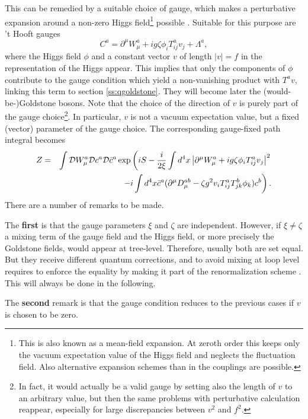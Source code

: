 \documentclass[final,twoside,12pt]{article}
\newcommand*{\no}{\noindent}
\newcommand*{\bea}{\begin{eqnarray}}
\newcommand*{\eea}{\end{eqnarray}}
\newcommand*{\be}{\begin{equation}}
\newcommand*{\ee}{\end{equation}}
\newcommand*{\pd}{\partial}
\newcommand*{\nn}{\nonumber}
\newcommand*{\1}{1\!\!\!\bot}
\begin{document}
This can be remedied by a suitable choice of gauge, which makes a perturbative expansion around a non-zero Higgs field\footnote{This is also known as a mean-field expansion. At zeroth order this keeps only the vacuum expectation value of the Higgs field and neglects the fluctuation field. Also alternative expansion schemes than in the couplings are possible.} possible \cite{Lee:1972fj,Lee:1974zg,Lee:1972yfa,Bohm:2001yx}. Suitable for this purpose are 't Hooft gauges \cite{Bohm:2001yx}
\be
C^a=\pd^\mu W_\mu^a+ig\zeta\phi_iT^a_{ij} v_j+\Lambda^a\label{thooftg},
\ee
\no where the Higgs field $\phi$ and a constant vector $v$ of length $|v|=f$ in the representation of the Higgs appear. This implies that only the components of $\phi$ contribute to the gauge condition which yield a non-vanishing product with $T^av$, linking this term to section \ref{ss:qgoldstone}. They will become later the (would-be-)Goldstone bosons. Note that the choice of the direction of $v$ is purely part of the gauge choice\footnote{In fact, it would actually be a valid gauge by setting also the length of $v$ to an arbitrary value, but then the same problems with perturbative calculation reappear, especially for large discrepancies between $v^2$ and $f^2$.}. In particular, $v$ is not a vacuum expectation value, but a fixed (vector) parameter of the gauge choice. The corresponding gauge-fixed path integral becomes
\bea
Z&=&\int{\cal D}W_\mu^a{\cal D}c^a{\cal D}{\bar c}^a\exp\left(iS-\frac{i}{2\xi}\int d^4 x\left|\pd^\mu W_\mu^a+ig\zeta\phi_iT^a_{ij} v_j\right|^2\right.\nn\\
&&\left.-i\int d^4x \bar{c}^a(\pd^\mu D_\mu^{ab}-\zeta g^2 v_iT^a_{ij}T^b_{jk}\phi_k) c^b\right)\label{thla}.
\eea
\no There are a number of remarks to be made.

The {\bf first} is that the gauge parameters $\xi$ and $\zeta$ are independent. However, if $\xi\neq\zeta$ a mixing term of the gauge field and the Higgs field, or more precisely the Goldstone fields, would appear at tree-level. Therefore, usually both are set equal. But they receive different quantum corrections, and to avoid mixing at loop level requires to enforce the equality by making it part of the renormalization scheme \cite{Bohm:2001yx}. This will always be done in the following.

The {\bf second} remark is that the gauge condition reduces to the previous cases if $v$ is chosen to be zero.
\end{document}
